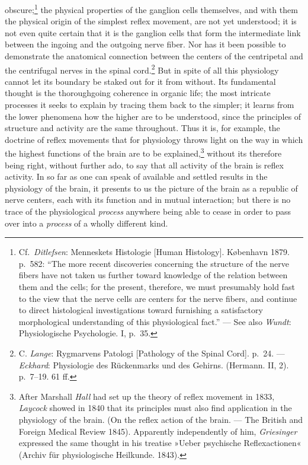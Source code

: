 \documentclass[12pt,a4paper]{book}
\newcommand{\opage}[1]{\marginnote{\footnotesize\textit{[#1]}}}
\begin{document}
obscure;\footnote{Cf.\ \emph{Ditlefsen}: Menneskets Histologie [Human
Histology]. København 1879. p.~582: ``The more recent discoveries
concerning the structure of the nerve fibers have not taken us further
toward knowledge of the relation between them and the cells; for the
present, therefore, we must presumably hold fast to the view that the
nerve cells are centers for the nerve fibers, and continue to direct
histological investigations toward furnishing a satisfactory
morphological understanding of this physiological fact.'' --- See also
\emph{Wundt}: Physiologische Psychologie. I, p.~35.} the physical
properties of the ganglion cells themselves, and with them the physical
origin of the simplest reflex movement, are not yet understood; it is
not even quite certain that it is the ganglion cells that form the
intermediate link between the ingoing and the outgoing nerve fiber. Nor
has it been possible to demonstrate the anatomical connection between
the centers of the centripetal and the centrifugal nerves in the spinal
cord.\footnote{C. \emph{Lange}: Rygmarvens Patologi [Pathology of the
Spinal Cord]. p.~24. --- \emph{Eckhard}: Physiologie des Rückenmarks und
des Gehirns. (Hermann. II, 2). p.~7--19. 61 ff.} But in spite
\opage{70}of all this physiology cannot let its boundary be staked out
for it from without. Its fundamental thought is the thoroughgoing
coherence in organic life; the most intricate processes it seeks to
explain by tracing them back to the simpler; it learns from the lower
phenomena how the higher are to be understood, since the principles of
structure and activity are the same throughout. Thus it is, for
example, the doctrine of reflex movements that for physiology throws
light on the way in which the highest functions of the brain are to be
explained,\footnote{After Marshall \emph{Hall} had set up the theory of
reflex movement in 1833, \emph{Laycock} showed in 1840 that its
principles must also find application in the physiology of the brain.
(On the reflex action of the brain. --- The British and Foreign Medical
Review 1845). Apparently independently of him, \emph{Griesinger}
expressed the same thought in his treatise »Ueber psychische
Reflexactionen« (Archiv für physiologische Heilkunde. 1843).} without
its therefore being right, without further ado, to say that all activity
of the brain is reflex activity. In so far as one can speak of available
and settled results in the physiology of the brain, it presents to us
the picture of the brain as a republic of nerve centers, each with its
function and in mutual interaction; but there is no trace of the
physiological \emph{process} anywhere being able to cease in order to
pass over into a \emph{process} of a wholly different kind.
\end{document}
